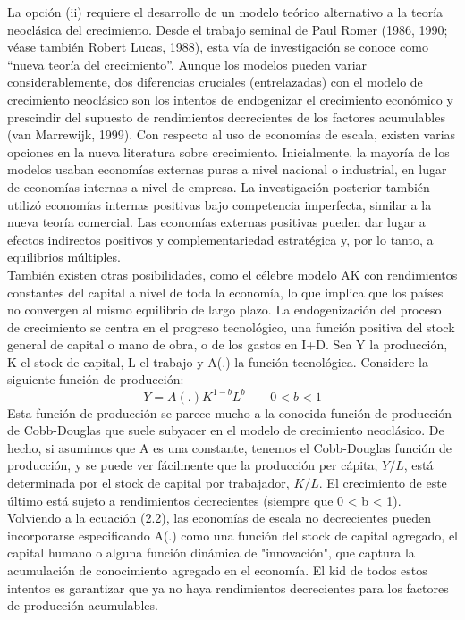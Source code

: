 La opción (ii) requiere el desarrollo de un modelo teórico alternativo a la teoría neoclásica del crecimiento. Desde el trabajo seminal de Paul Romer (1986, 1990; véase también Robert Lucas, 1988), esta vía de investigación se conoce como “nueva teoría del crecimiento”. Aunque los modelos pueden variar considerablemente, dos diferencias cruciales (entrelazadas) con el modelo de crecimiento neoclásico son los intentos de endogenizar el crecimiento económico y prescindir del supuesto de rendimientos decrecientes de los factores acumulables (van Marrewijk, 1999). Con respecto al uso de economías de escala, existen varias opciones en la nueva literatura sobre crecimiento. Inicialmente, la mayoría de los modelos usaban economías externas puras a nivel nacional o industrial, en lugar de economías internas a nivel de empresa. La investigación posterior también utilizó economías internas positivas bajo competencia imperfecta, similar a la nueva teoría comercial. Las economías externas positivas pueden dar lugar a efectos indirectos positivos y complementariedad estratégica y, por lo tanto, a equilibrios múltiples.\\
También existen otras posibilidades, como el célebre modelo AK con rendimientos constantes del capital a nivel de toda la economía, lo que implica que los países no convergen al mismo equilibrio de largo plazo. La endogenización del proceso de crecimiento se centra en el progreso tecnológico, una función positiva del stock general de capital o mano de obra, o de los gastos en I+D. Sea Y la producción, K el stock de capital, L el trabajo y A(.) la función tecnológica. Considere la siguiente función de producción:
\begin{equation}
Y=A(.)K^{1-b} L^b \qquad 0<b<1
\end{equation}
Esta función de producción se parece mucho a la conocida función de producción de Cobb-Douglas que suele subyacer en el modelo de crecimiento neoclásico. De hecho, si asumimos que A es una constante, tenemos el Cobb-Douglas función de producción, y se puede ver fácilmente que la producción per cápita, $Y/L$, está determinada por el stock de capital por trabajador, $K/L$. El crecimiento de este último está sujeto a rendimientos decrecientes (siempre que 0 < b < 1). Volviendo a la ecuación (2.2), las economías de escala no decrecientes pueden incorporarse especificando A(.) como una función del stock de capital agregado, el capital humano o alguna función dinámica de "innovación", que captura la acumulación de conocimiento agregado en el economía. El kid de todos estos intentos es garantizar que ya no haya rendimientos decrecientes para los factores de producción acumulables.\\
